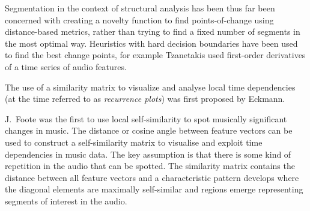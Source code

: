 \documentclass[twocolumn]{article}
\begin{document}
	Segmentation in the context of structural analysis has been thus far been concerned with creating a novelty function to find points-of-change using distance-based metrics, rather than trying to find a fixed number of segments in the most optimal way. Heuristics with hard decision boundaries have been used to find the best change points, for example Tzanetakis \cite{tzanetakis1999framework} used first-order derivatives of a time series of audio features. 
	
	The use of a similarity matrix to visualize and analyse local time dependencies (at the time referred to as \textit{recurrence plots}) was first proposed by Eckmann\citep{eckmann1987recurrence}.
	
	J.\ Foote \citep{cooper2002automatic, foote1999visualizing,foote1997similarity,foote2000automatic,foote2003media,foote2001visualizing} was the first to use local self-similarity to spot musically significant changes in music. The distance or cosine angle between feature vectors can be used to construct a self-similarity matrix to visualise and exploit time dependencies in music data. The key assumption is that there is some kind of repetition in the audio that can be spotted. The similarity matrix contains the distance between all feature vectors and a characteristic pattern develops where the diagonal elements are maximally self-similar and regions emerge representing segments of interest in the audio.  
	
\end{document}
